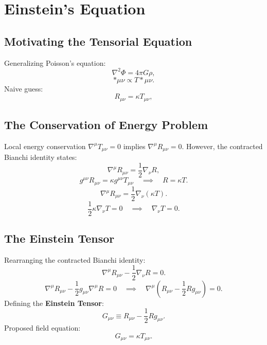 \documentclass[11pt, a4paper]{report}
\begin{document}
\section{Einstein's Equation}

\subsection{Motivating the Tensorial Equation}
Generalizing Poisson's equation:
\begin{equation}
\label{eq:poisson_equation}
\nabla^{2}\Phi = 4\pi G\rho,
\end{equation}
\begin{equation}
[\nabla^{2}g]*{\mu\nu} \propto T*{\mu\nu}.
\end{equation}
Naive guess:
\begin{equation}
\label{eq:naive_einstein}
R_{\mu\nu} = \kappa T_{\mu\nu},
\end{equation}

\subsection{The Conservation of Energy Problem}
Local energy conservation $\nabla^{\mu}T_{\mu\nu} = 0$ implies $\nabla^{\mu}R_{\mu\nu} = 0$.
However, the contracted Bianchi identity states:
\begin{equation}
\label{eq:contracted_bianchi_again}
\nabla^{\mu}R_{\mu\nu} = \frac{1}{2}\nabla_{\nu}R,
\end{equation}
\begin{equation}
g^{\mu\nu}R_{\mu\nu} = \kappa g^{\mu\nu}T_{\mu\nu} \quad \implies \quad R = \kappa T.
\end{equation}
\begin{equation}
\nabla^{\mu}R_{\mu\nu} = \frac{1}{2}\nabla_{\nu}(\kappa T).
\end{equation}
\begin{equation}
\frac{1}{2}\kappa \nabla_{\nu}T = 0 \quad \implies \quad \nabla_{\nu}T = 0.
\end{equation}

\subsection{The Einstein Tensor}
Rearranging the contracted Bianchi identity:
\begin{equation}
\nabla^{\mu}R_{\mu\nu} - \frac{1}{2}\nabla_{\nu}R = 0.
\end{equation}
\begin{equation}
\nabla^{\mu}R_{\mu\nu} - \frac{1}{2}g_{\mu\nu}\nabla^{\mu}R = 0 \quad \implies \quad \nabla^{\mu}\left( R_{\mu\nu} - \frac{1}{2}R g_{\mu\nu} \right) = 0.
\end{equation}
Defining the \textbf{Einstein Tensor}:
\begin{equation}
\label{eq:einstein_tensor_def}
G_{\mu\nu} \equiv R_{\mu\nu} - \frac{1}{2}R g_{\mu\nu}.
\end{equation}
Proposed field equation:
\begin{equation}
\label{eq:einstein_proposed}
G_{\mu\nu} = \kappa T_{\mu\nu}.
\end{equation}
\end{document}
